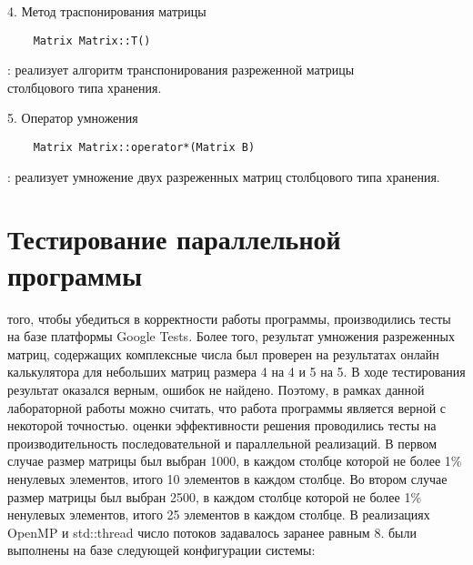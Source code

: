 \documentclass{report}
\begin{document}
\par 4. Метод траспонирования матрицы
\begin{lstlisting}
    Matrix Matrix::T()
\end{lstlisting}
: реализует алгоритм транспонирования разреженной матрицы \\
столбцового типа хранения.

\par 5. Оператор умножения
\begin{lstlisting}
    Matrix Matrix::operator*(Matrix B)
\end{lstlisting}
: реализует умножение двух разреженных матриц столбцового типа хранения.

\newpage

\section*{Тестирование параллельной программы}
 того, чтобы убедиться в корректности работы программы, производились тесты на базе платформы Google Tests. Более того, результат умножения разреженных матриц, содержащих комплексные числа был проверен на результатах онлайн калькулятора для небольших матриц размера 4 на 4 и 5 на 5. В ходе тестирования результат оказался верным, ошибок не найдено. Поэтому, в рамках данной лабораторной работы можно считать, что работа программы является верной с некоторой точностью.
 оценки эффективности решения проводились тесты на производительность последовательной и параллельной реализаций. В первом случае размер матрицы был выбран 1000, в каждом столбце которой не более 1\% ненулевых элементов, итого 10 элементов в каждом столбце. Во втором случае размер матрицы был выбран 2500, в каждом столбце которой не более 1\% ненулевых элементов, итого 25 элементов в каждом столбце. В реализациях OpenMP и std::thread число потоков задавалось заранее равным 8.
 были выполнены на базе следующей конфигурации системы:
\end{document}
